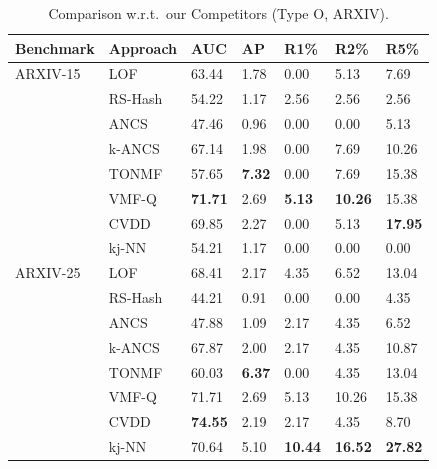 \begin{table}
\renewrobustcmd{\boldmath}{}
    \centering
    \caption{Comparison w.r.t.\ our Competitors (Type O, ARXIV).}
    \label{result:arxiv_typeA}
    \addtolength{\tabcolsep}{-3pt}
    \centering
    \footnotesize
\renewcommand{\arraystretch}{0.35}
    \begin{tabularx}{\columnwidth}{@{}XXXXXXX@{}}
\toprule
Benchmark   & Approach & \gls{AUC} & \gls{AP} & R1\% & R2\% & R5\% \\ \midrule

ARXIV-15 & \gls{LOF}     & 63.44 &	1.78 &	0.00 &	5.13 &	7.69 	 \\
         & \gls{RS-Hash} & 54.22 & 1.17  & 2.56  & 2.56  & 2.56  \\
         & \gls{ANCS}     & 47.46 & 0.96  & 0.00  & 0.00  & 5.13  \\
         & \gls{k-ANCS}   & 67.14  &	1.98 &	0.00 &	7.69 &	10.26 \\
         & \gls{TONMF}   & 57.65 	& \bfseries7.32  &	0.00  &	7.69 &	15.38 	     \\
         & \gls{VMF-Q}   & \bfseries71.71 & 2.69  & \bfseries 5.13  & \bfseries10.26 & 15.38 \\
         & \gls{CVDD}     & 69.85	& 2.27 &	0.00 &	5.13 &	\bfseries17.95  \\
         & \gls{kj-NN}   & 54.21 & 1.17  & 0.00  & 0.00  & 0.00  \\ \midrule

ARXIV-25 & \gls{LOF}     & 68.41 & 2.17  & 4.35  & 6.52  & 13.04 \\
         & \gls{RS-Hash} & 44.21 & 0.91  & 0.00  & 0.00  & 4.35  \\
         & \gls{ANCS}     & 47.88 & 1.09  & 2.17  & 4.35  & 6.52  \\
         & \gls{k-ANCS}   & 67.87 & 2.00  & 2.17  & 4.35  & 10.87 \\
         & \gls{TONMF}   & 60.03 & \bfseries6.37 &	0.00   & 4.35 & 13.04      \\
         & \gls{VMF-Q}   & 71.71 & 2.69  & 5.13  & 10.26 & 15.38 \\
         & \gls{CVDD}     & \bfseries 74.55 & 2.19	& 2.17	& 4.35	& 8.70  \\
         & \gls{kj-NN}   & 70.64 &	5.10 &\bfseries	10.44 &\bfseries	16.52 &\bfseries	27.82 	 \\ \midrule


\end{tabularx}
\end{table}
